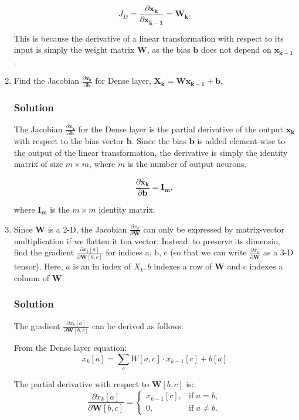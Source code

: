 \documentclass{article}
\begin{document}
\begin{enumerate}[label=\alph*)]
      \[
      J_D = \frac{\partial \mathbf{x_k}}{\partial \mathbf{x_{k-1}}} = \mathbf{W_k}.
      \]

      This is because the derivative of a linear transformation with respect to its input is simply the weight matrix \(\mathbf{W}\), as the bias \(\mathbf{b}\) does not depend on \(\mathbf{x_{k-1}}\).
   
   \item Find the Jacobian \( \frac{\partial \mathbf{x_k}}{\partial \mathbf{b}}\) for Dense layer, \(\mathbf{X_k = Wx_{k-1} + b}\).
   \subsubsection*{Solution}
   The Jacobian \( \frac{\partial \mathbf{x_k}}{\partial \mathbf{b}} \) for the Dense layer is the partial derivative of the output \(\mathbf{x_k}\) 
   with respect to the bias vector \(\mathbf{b}\). Since the bias \(\mathbf{b}\) is added element-wise to the output of the linear transformation,
    the derivative is simply the identity matrix of size \(m \times m\), where \(m\) is the number of output neurons.

   \[
   \frac{\partial \mathbf{x_k}}{\partial \mathbf{b}} = \mathbf{I_m},
   \]

   where \(\mathbf{I_m}\) is the \(m \times m\) identity matrix.

   \item Since \(\mathbf{W}\) is a 2-D, the Jacobian \(\frac{\partial x_k}{\partial \mathbf{W}}\) can only be expressed by matrix-vector multiplication
   if we flatten it toa  vector. Instead, to preserve its dimensio, find the gradient \(\frac{\partial x_k[a]}{\partial \mathbf{W}[b,c]}\) for indices 
   a, b, c (so that we can write \(\frac{\partial x_k}{\partial \mathbf{W}}\) as a 3-D tensor). Here, \(a\) is an in index of \(X_k , b\) indexes a row 
   of \(\mathbf{W}\) and c indexes a column of \(\mathbf{W}\).
   \subsubsection*{Solution}
   The gradient \(\frac{\partial x_k[a]}{\partial \mathbf{W}[b,c]}\) can be derived as follows:

   From the Dense layer equation:
   \[
   x_k[a] = \sum_{c} W[a, c] \cdot x_{k-1}[c] + b[a]
   \]

   The partial derivative with respect to \(\mathbf{W}[b, c]\) is:
   \[
   \frac{\partial x_k[a]}{\partial \mathbf{W}[b, c]} =
   \begin{cases}
   x_{k-1}[c], & \text{if } a = b, \\
   0, & \text{if } a \neq b.
   \end{cases}
   \]


\end{enumerate}
\end{document}
